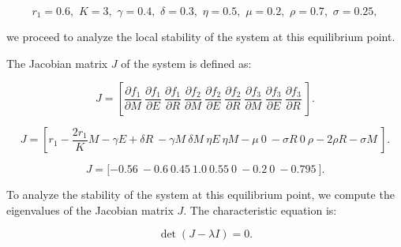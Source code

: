 \documentclass[10pt]{NSP1}
\begin{document}
\[
r_{1} = 0.6,\mspace{6mu} K = 3,\mspace{6mu}\gamma = 0.4,\mspace{6mu}\delta = 0.3,\mspace{6mu}\eta = 0.5,\mspace{6mu}\mu = 0.2,\mspace{6mu}\rho = 0.7,\mspace{6mu}\sigma = 0.25,
\]

we proceed to analyze the local stability of the system at this equilibrium point.

\par\medskip{}\smallskip

The Jacobian matrix \(J\) of the system is defined as:

\[
J = \left\lbrack \frac{\partial f_{1}}{\partial M}\ \frac{\partial f_{1}}{\partial E}\ \frac{\partial f_{1}}{\partial R}\ \frac{\partial f_{2}}{\partial M}\ \frac{\partial f_{2}}{\partial E}\ \frac{\partial f_{2}}{\partial R}\ \frac{\partial f_{3}}{\partial M}\ \frac{\partial f_{3}}{\partial E}\ \frac{\partial f_{3}}{\partial R}\ \right\rbrack.
\]

\par\vspace{9.0pt}\vspace{9.0pt}

\[
J = \left\lbrack r_{1} - \frac{2r_{1}}{K}M - \gamma E + \delta R\ - \gamma M\ \delta M\ \eta E\ \eta M - \mu\ 0\ - \sigma R\ 0\ \rho - 2\rho R - \sigma M\ \right\rbrack.
\]

\par\vspace{9.0pt}\vspace{9.0pt}

\[
J = \lbrack - 0.56\ - 0.6\ 0.45\ 1.0\ 0.55\ 0\ - 0.2\ 0\ - 0.795\ \rbrack.
\]

\par\medskip{}\smallskip

To analyze the stability of the system at this equilibrium point, we compute the eigenvalues of the Jacobian matrix \(J\). The characteristic equation is:

\[
\det(J - \lambda I) = 0.
\]

\par\vspace{9.0pt}\vspace{9.0pt}
\end{document}
